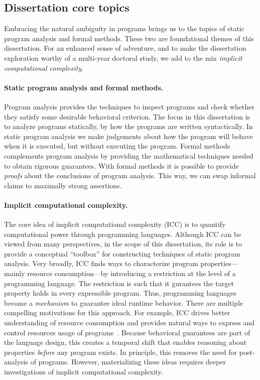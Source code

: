 \subsection{Dissertation core topics}
\label{subsec:dissertation-themes}

Embracing the natural ambiguity in programs brings us to the topics of static program analysis and formal methods.
These two are foundational themes of this dissertation.
For an enhanced sense of adventure, and to make the dissertation exploration worthy of a multi-year doctoral study, we add to the mix \emph{implicit computational complexity}.

\paragraph{Static program analysis and formal methods.}
Program analysis provides the techniques to inspect programs and check whether they satisfy some desirable behavioral criterion.
The focus in this dissertation is to analyze programs statically, \ie by how the programs are written syntactically.
In static program analysis we make judgements about how the program will behave when it is executed, but without executing the program.
Formal methods complements program analysis by providing the mathematical techniques needed to obtain rigorous guarantees.
With formal methods it is possible to provide \emph{proofs} about the conclusions of program analysis.
This way, we can swap informal claims to maximally strong assertions.

\paragraph*{Implicit computational complexity.}
The core idea of implicit computational complexity (ICC) is to quantify computational power through programming languages.
Although ICC can be viewed from many perspectives, in the scope of this dissertation, its role is to provide a conceptual \enquote{toolbox} for constructing techniques of static program analysis.
Very broadly, ICC finds ways to characterize program properties---mainly resource consumption---by introducing a restriction at the level of a programming language.
The restriction is such that it gurantees the target property holds in every expressible program.
Thus, programming languages become a \emph{mechanism} to guarantee ideal runtime behavior.
There are multiple compelling motivations for this approach.
For example, ICC drives better understanding of resource consumption and provides natural ways to express and control resources usage of programs~\cite{kristiansen2017}.
Because behavioral guarantees are part of the language design, this creates a temporal shift that enables reasoning about properties \emph{before} any program exists.
In principle, this removes the need for post-analysis of programs.
However, materializing these ideas requires deeper investigations of implicit computational complexity.

